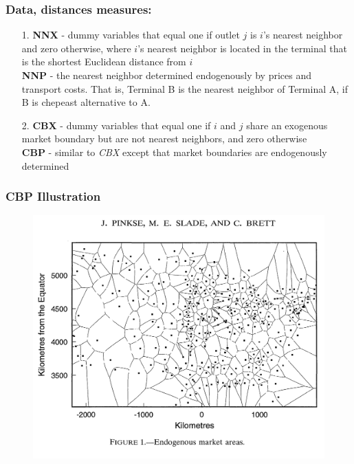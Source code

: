 \documentclass{beamer}
\begin{document}
\begin{frame}
  \frametitle{Data, distances measures:}
  \begin{itemize}
    \item[1.] \textbf{NNX} - dummy variables that equal one if outlet $j$ is $i$'s nearest neighbor and zero otherwise, where $i$'s nearest neighbor is located in the terminal that is the shortest Euclidean distance from $i$ \\
      \textbf{NNP} - the nearest neighbor determined endogenously by prices and transport costs. That is, Terminal B is the nearest neighbor of Terminal A, if B is chepeast alternative to A.
    \item[2.] \textbf{CBX} - dummy variables that equal one if $i$ and $j$ share an exogenous market boundary but are not nearest neighbors, and zero otherwise \\
      \textbf{CBP} - similar to \textit{CBX} except that market boundaries are endogenously determined
  \end{itemize}
\end{frame}


\begin{frame}
  \frametitle{CBP Illustration}
  \begin{figure}
    \includegraphics[width=\linewidth]{CBN.png}
  \end{figure}
\end{frame}
\end{document}
